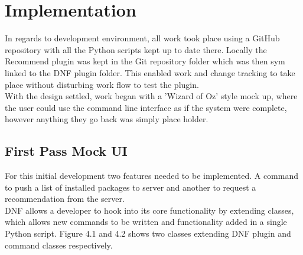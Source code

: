 \documentclass{l4proj}
\begin{document}
 
\chapter{Implementation}
In regards to development environment, all work took place using a GitHub repository with all the Python scripts kept up to date there. Locally the Recommend plugin was kept in the Git repository folder which was then sym linked to the DNF plugin folder. This enabled work and change tracking to take place without disturbing work flow to test the plugin.\\
With the design settled, work began with a 'Wizard of Oz'\cite{wizofoz} style mock up, where the user could use the command line interface as if the system were complete, however anything they go back was simply place holder.

\section{First Pass Mock UI}
For this initial development two features needed to be implemented. A command to push a list of installed packages to server and another to request a recommendation from the server.\\
DNF allows a developer to hook into its core functionality by extending classes, which allows new commands to be written and functionality added in a single Python script. Figure 4.1 and 4.2 shows two classes extending DNF plugin and command classes respectively.
\begin{figure}

\end{figure}
\begin{figure}

\end{figure}
\end{document}
